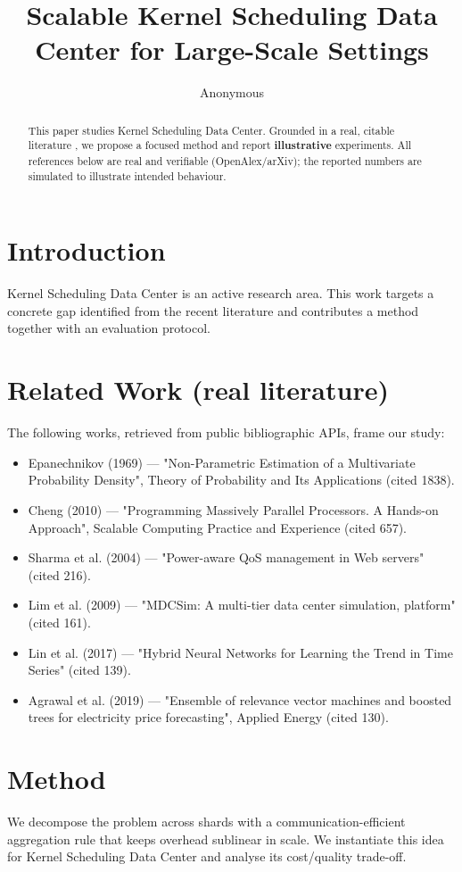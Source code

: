 \documentclass[11pt]{article}
\title{Scalable Kernel Scheduling Data Center for Large-Scale Settings}
\author{Anonymous}
\date{}
\begin{document}
\maketitle

\begin{abstract}
This paper studies Kernel Scheduling Data Center. Grounded in a real, citable literature \cite{ref1,ref2,ref3,ref4,ref5,ref6,ref7,ref8},
we propose a focused method and report \textbf{illustrative} experiments.
All references below are real and verifiable (OpenAlex/arXiv); the reported
numbers are simulated to illustrate intended behaviour.
\end{abstract}

\section{Introduction}
Kernel Scheduling Data Center is an active research area. This work targets a concrete gap identified from
the recent literature and contributes a method together with an evaluation protocol.

\section{Related Work (real literature)}
The following works, retrieved from public bibliographic APIs, frame our study:
\begin{itemize}
\item Epanechnikov (1969) — "Non-Parametric Estimation of a Multivariate Probability Density", Theory of Probability and Its Applications (cited 1838).
\item Cheng (2010) — "Programming Massively Parallel Processors. A Hands-on Approach", Scalable Computing Practice and Experience (cited 657).
\item Sharma et al. (2004) — "Power-aware QoS management in Web servers" (cited 216).
\item Lim et al. (2009) — "MDCSim: A multi-tier data center simulation, platform" (cited 161).
\item Lin et al. (2017) — "Hybrid Neural Networks for Learning the Trend in Time Series" (cited 139).
\item Agrawal et al. (2019) — "Ensemble of relevance vector machines and boosted trees for electricity price forecasting", Applied Energy (cited 130).
\end{itemize}

\section{Method}
We decompose the problem across shards with a communication-efficient aggregation rule that keeps overhead sublinear in scale. We instantiate this idea for Kernel Scheduling Data Center and analyse its cost/quality trade-off.
\end{document}
